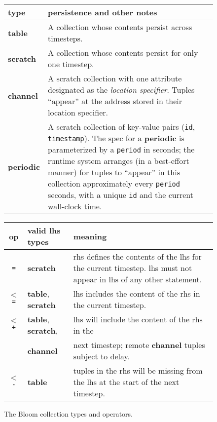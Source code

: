 \begin{figure}
	\begin{small}
	\begin{tabular}{|l|p{2.55in}|}
		\hline
		type & persistence and other notes\\
		\hline
		\textbf{table} & A collection whose contents persist across timesteps.\\
		\textbf{scratch} & A collection whose contents persist for only one timestep.\\
		\textbf{channel} & A scratch collection with one attribute designated as the {\em location specifier}. Tuples ``appear'' at the address stored in their location specifier.\\
		\textbf{periodic} & A scratch collection of key-value pairs (\texttt{id}, \texttt{timestamp}).  The spec for a \textbf{periodic} is parameterized by a \texttt{period} in seconds; the runtime system arranges (in a best-effort manner) for tuples to ``appear'' in this collection approximately every \texttt{period} seconds, with a unique \texttt{id} and the current wall-clock time.\\
		\hline
	\end{tabular}

	\vspace{2em}
	
	\begin{tabular}{|c|l|p{2in}|}
		\hline
		op & valid lhs types & meaning\\
				\hline 
		\texttt{=} & \textbf{scratch} & rhs defines the contents of the lhs for the current timestep.  lhs must not appear in lhs of any other statement.\\
		\texttt{$<$=} & \textbf{table}, \textbf{scratch} & lhs includes the content of the rhs in the current timestep.\\
		\texttt{$<$+} & \textbf{table}, \textbf{scratch}, & lhs will include the content of the rhs in the\\
		              & \textbf{channel} &  next timestep; remote \textbf{channel} tuples subject to delay.\\
		\texttt{$<$-} & \textbf{table} & tuples in the rhs will be missing from the lhs at the start of  the next timestep.\\
		\hline
	\end{tabular}
	\end{small}
	\caption{The Bloom collection types and operators.}
	\label{tab:bloom}
\end{figure}

